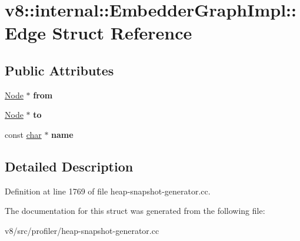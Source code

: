 \hypertarget{structv8_1_1internal_1_1EmbedderGraphImpl_1_1Edge}{}\section{v8\+:\+:internal\+:\+:Embedder\+Graph\+Impl\+:\+:Edge Struct Reference}
\label{structv8_1_1internal_1_1EmbedderGraphImpl_1_1Edge}
\subsection*{Public Attributes}
\begin{DoxyCompactItemize}
\item 
\mbox{\label{structv8_1_1internal_1_1EmbedderGraphImpl_1_1Edge_a3d3e84395de6c442a003d67021b2e61b}} 
\mbox{\hyperlink{classv8_1_1EmbedderGraph_1_1Node}{Node}} $\ast$ {\bfseries from}
\item 
\mbox{\label{structv8_1_1internal_1_1EmbedderGraphImpl_1_1Edge_afca3c5ac660e3e2559a992d9a34adf78}} 
\mbox{\hyperlink{classv8_1_1EmbedderGraph_1_1Node}{Node}} $\ast$ {\bfseries to}
\item 
\mbox{\label{structv8_1_1internal_1_1EmbedderGraphImpl_1_1Edge_ad5d80106e436a33492826e630d49cd8c}} 
const \mbox{\hyperlink{classchar}{char}} $\ast$ {\bfseries name}
\end{DoxyCompactItemize}


\subsection{Detailed Description}


Definition at line 1769 of file heap-\/snapshot-\/generator.\+cc.



The documentation for this struct was generated from the following file\+:\begin{DoxyCompactItemize}
\item 
v8/src/profiler/heap-\/snapshot-\/generator.\+cc\end{DoxyCompactItemize}
